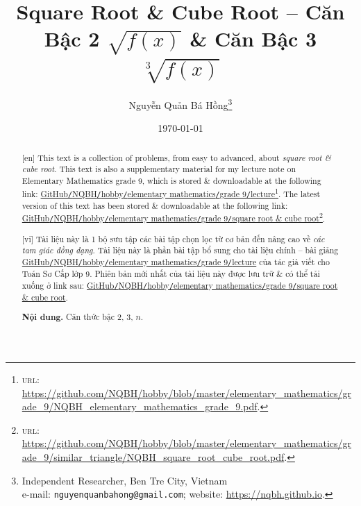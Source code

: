 \documentclass{article}
\title{Square Root \& Cube Root -- Căn Bậc 2 $\sqrt{f(x)}$ \& Căn Bậc 3 $\sqrt[3]{f(x)}$}
\author{Nguyễn Quản Bá Hồng\footnote{Independent Researcher, Ben Tre City, Vietnam\\e-mail: \texttt{nguyenquanbahong@gmail.com}; website: \url{https://nqbh.github.io}.}}
\date{\today}
\begin{document}
\maketitle
\begin{abstract}
	\textsf{[en]} This text is a collection of problems, from easy to advanced, about \textit{square root \& cube root}. This text is also a supplementary material for my lecture note on Elementary Mathematics grade 9, which is stored \& downloadable at the following link: \href{https://github.com/NQBH/hobby/blob/master/elementary_mathematics/grade_9/NQBH_elementary_mathematics_grade_9.pdf}{GitHub\texttt{/}NQBH\texttt{/}hobby\texttt{/}elementary mathematics\texttt{/}grade 9\texttt{/}lecture}\footnote{\textsc{url}: \url{https://github.com/NQBH/hobby/blob/master/elementary_mathematics/grade_9/NQBH_elementary_mathematics_grade_9.pdf}.}. The latest version of this text has been stored \& downloadable at the following link: \href{https://github.com/NQBH/hobby/blob/master/elementary_mathematics/grade_9/square_root_cube_root/NQBH_square_root_cube_root.pdf}{GitHub\texttt{/}NQBH\texttt{/}hobby\texttt{/}elementary mathematics\texttt{/}grade 9\texttt{/}square root \& cube root}\footnote{\textsc{url}: \url{https://github.com/NQBH/hobby/blob/master/elementary_mathematics/grade_9/similar_triangle/NQBH_square_root_cube_root.pdf}.}.
	\vspace{2mm}
	
	\textsf{[vi]} Tài liệu này là 1 bộ sưu tập các bài tập chọn lọc từ cơ bản đến nâng cao về \textit{các tam giác đồng dạng}. Tài liệu này là phần bài tập bổ sung cho tài liệu chính -- bài giảng \href{https://github.com/NQBH/hobby/blob/master/elementary_mathematics/grade_9/NQBH_elementary_mathematics_grade_9.pdf}{GitHub\texttt{/}NQBH\texttt{/}hobby\texttt{/}elementary mathematics\texttt{/}grade 9\texttt{/}lecture} của tác giả viết cho Toán Sơ Cấp lớp 9. Phiên bản mới nhất của tài liệu này được lưu trữ \& có thể tải xuống ở link sau: \href{https://github.com/NQBH/hobby/blob/master/elementary_mathematics/grade_9/square_root_cube_root/NQBH_square_root_cube_root.pdf}{GitHub\texttt{/}NQBH\texttt{/}hobby\texttt{/}elementary mathematics\texttt{/}grade 9\texttt{/}square root \& cube root}.
	
	\textsf{\textbf{Nội dung.} Căn thức bậc 2, 3, $n$.}
\end{abstract}
\tableofcontents
\newpage

\end{document}
